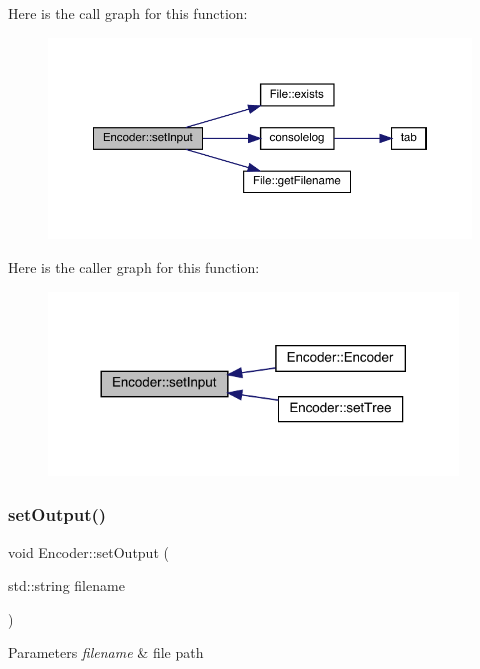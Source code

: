 Here is the call graph for this function\+:
\nopagebreak
\begin{figure}[H]
\begin{center}
\leavevmode
\includegraphics[width=350pt]{class_encoder_af5623d0bd5fc7b1b2be27375d2994eb1_cgraph}
\end{center}
\end{figure}
Here is the caller graph for this function\+:
\nopagebreak
\begin{figure}[H]
\begin{center}
\leavevmode
\includegraphics[width=308pt]{class_encoder_af5623d0bd5fc7b1b2be27375d2994eb1_icgraph}
\end{center}
\end{figure}
\mbox{\label{class_encoder_a81e43409dc83e9118472a81ba65e6779}} 
\subsubsection{\texorpdfstring{set\+Output()}{setOutput()}}
{\footnotesize\ttfamily void Encoder\+::set\+Output (\begin{DoxyParamCaption}\item[{std\+::string}]{filename }\end{DoxyParamCaption})}


\begin{DoxyParams}{Parameters}
{\em filename} & file path \\
\hline
\end{DoxyParams}


